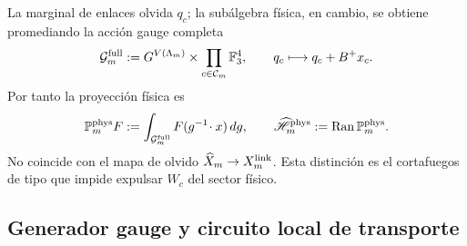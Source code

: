 La marginal de enlaces olvida $q_c$; la subálgebra física, en cambio, se obtiene
promediando la acción gauge completa
\begin{equation}\label{eq:pdf2-ym-full-gauge-group}
 \mathcal G_m^{\rm full}
 :=G^{V(\Lambda_m)}\times
 \prod_{c\in\mathcal C_m}\mathbb F_3^4,
 \qquad q_c\longmapsto q_c+B^+x_c.
\end{equation}
Por tanto la proyección física es
\begin{equation}\label{eq:pdf2-ym-full-physical-projection}
 \mathbb P_m^{\rm phys}F
 :=\int_{\mathcal G_m^{\rm full}}F(g^{-1}\!\cdot x)\,dg,
 \qquad
 \widehat{\mathscr H}_m^{\rm phys}
 :=\operatorname{Ran}\mathbb P_m^{\rm phys}.
\end{equation}
No coincide con el mapa de olvido
$\widehat X_m\to X_m^{\rm link}$. Esta distinción es el cortafuegos de tipo
que impide expulsar $W_c$ del sector físico.

\subsection{Generador gauge y circuito local de transporte}

